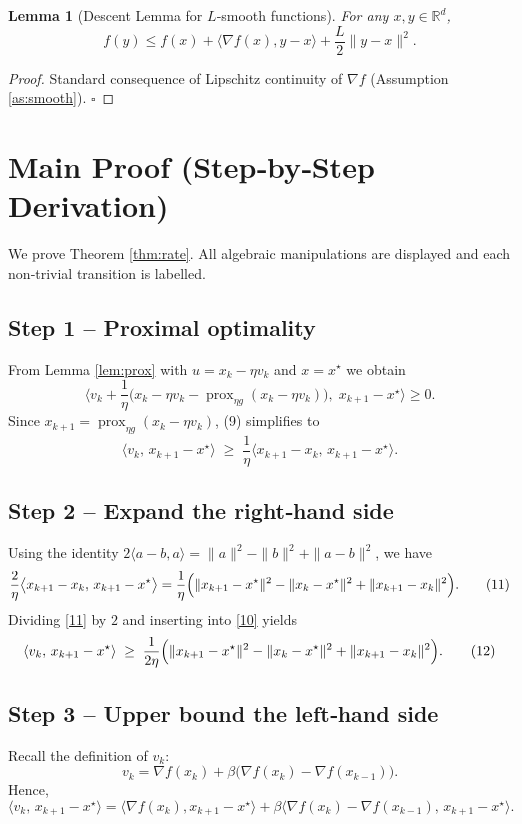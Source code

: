 \documentclass{article}
\newtheorem{lemma}{Lemma}
\newcommand{\prox}{\operatorname{prox}}
\begin{document}
\begin{lemma}[Descent Lemma for $L$‑smooth functions]\label{lem:descent}
For any $x,y\in\mathbb{R}^d$,
\[
f(y)\le f(x)+\langle \nabla f(x),y-x\rangle+\frac{L}{2}\|y-x\|^2 .
\tag{8}
\]
\end{lemma}
\begin{proof}
Standard consequence of Lipschitz continuity of $\nabla f$ (Assumption \ref{as:smooth}). \hfill $\square$
\end{proof}

\section*{Main Proof (Step‑by‑Step Derivation)}
We prove Theorem \ref{thm:rate}.  All algebraic manipulations are displayed and each non‑trivial transition is labelled.

\subsection*{Step 1 – Proximal optimality}
From Lemma \ref{lem:prox} with $u = x_k-\eta v_k$ and $x = x^\star$ we obtain
\[
\Big\langle v_k + \frac{1}{\eta}\bigl(x_k-\eta v_k-\prox_{\eta g}(x_k-\eta v_k)\bigr),\;
x_{k+1}-x^\star\Big\rangle \ge 0 .
\tag{9}
\]
Since $x_{k+1}= \prox_{\eta g}(x_k-\eta v_k)$, (9) simplifies to
\[
\big\langle v_k ,\, x_{k+1}-x^\star\big\rangle \;\ge\;
\frac{1}{\eta}\big\langle x_{k+1}-x_k ,\, x_{k+1}-x^\star\big\rangle .
\tag{10}
\]

\subsection*{Step 2 – Expand the right‑hand side}
Using the identity $2\langle a-b,a\rangle = \|a\|^2-\|b\|^2+\|a-b\|^2$, we have
\[
\frac{2}{\eta}\big\langle x_{k+1}-x_k ,\, x_{k+1}-x^\star\big\rangle
= \frac{1}{\eta}\Bigl(\|x_{k+1}-x^\star\|^2-\|x_k-x^\star\|^2+\|x_{k+1}-x_k\|^2\Bigr).
\tag{11}
\]
Dividing \eqref{11} by $2$ and inserting into \eqref{10} yields
\[
\langle v_k ,\, x_{k+1}-x^\star\rangle \;\ge\;
\frac{1}{2\eta}\Bigl(\|x_{k+1}-x^\star\|^2-\|x_k-x^\star\|^2+\|x_{k+1}-x_k\|^2\Bigr).
\tag{12}
\]

\subsection*{Step 3 – Upper bound the left‑hand side}
Recall the definition of $v_k$:
\[
v_k = \nabla f(x_k)+\beta\bigl(\nabla f(x_k)-\nabla f(x_{k-1})\bigr).
\tag{13}
\]
Hence,
\[
\langle v_k ,\, x_{k+1}-x^\star\rangle
= \langle \nabla f(x_k),x_{k+1}-x^\star\rangle
+ \beta\langle \nabla f(x_k)-\nabla f(x_{k-1}),\,x_{k+1}-x^\star\rangle .
\tag{14}
\]
\end{document}
